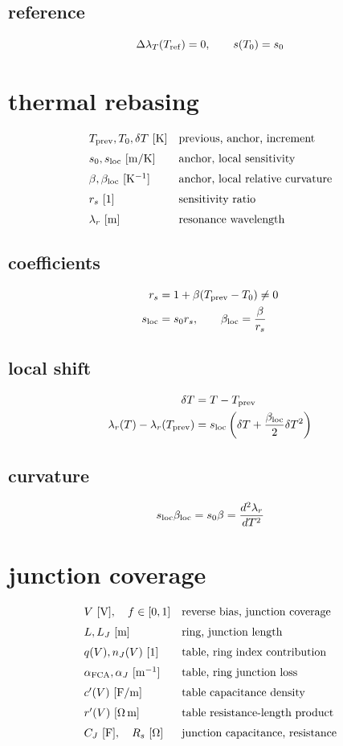 \documentclass[11pt]{article}
\begin{document}
\subsection*{reference}
\[
\displaystyle \Delta\lambda_T(T_{\rm ref})=0,\qquad s(T_0)=s_0
\]

\clearpage
\section*{thermal rebasing}
\[
\begin{array}{ll}T_{\rm prev},T_0,\delta T\ [\mathrm K]&\text{previous, anchor, increment}\\[0.6em]s_0,s_{\rm loc}\ [\mathrm{m/K}]&\text{anchor, local sensitivity}\\[0.6em]\beta,\beta_{\rm loc}\ [\mathrm{K^{-1}}]&\text{anchor, local relative curvature}\\[0.6em]r_s\ [1]&\text{sensitivity ratio}\\[0.6em]\lambda_r\ [\mathrm m]&\text{resonance wavelength}\end{array}
\]
\subsection*{coefficients}
\[
\displaystyle \begin{aligned}r_s&=1+\beta(T_{\rm prev}-T_0)\ne0\\s_{\rm loc}&=s_0r_s,\qquad\beta_{\rm loc}=\frac{\beta}{r_s}\end{aligned}
\]
\subsection*{local shift}
\[
\displaystyle \begin{aligned}\delta T&=T-T_{\rm prev}\\\lambda_r(T)-\lambda_r(T_{\rm prev})&=s_{\rm loc}\left(\delta T+\frac{\beta_{\rm loc}}2\delta T^2\right)\end{aligned}
\]
\subsection*{curvature}
\[
\displaystyle s_{\rm loc}\beta_{\rm loc}=s_0\beta=\frac{d^2\lambda_r}{dT^2}
\]

\clearpage
\section*{junction coverage}
\[
\begin{array}{ll}V\ [\mathrm V],\quad f\in[0,1]&\text{reverse bias, junction coverage}\\[0.6em]L,L_J\ [\mathrm m]&\text{ring, junction length}\\[0.6em]q(V),n_J(V)\ [1]&\text{table, ring index contribution}\\[0.6em]\alpha_{\rm FCA},\alpha_J\ [\mathrm{m^{-1}}]&\text{table, ring junction loss}\\[0.6em]c'(V)\ [\mathrm{F/m}]&\text{table capacitance density}\\[0.6em]r'(V)\ [\Omega\,\mathrm m]&\text{table resistance-length product}\\[0.6em]C_J\ [\mathrm F],\quad R_s\ [\Omega]&\text{junction capacitance, resistance}\end{array}
\]
\end{document}
